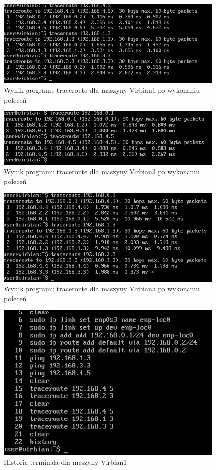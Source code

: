 \documentclass[a4paper]{scrartcl}
\begin{document}
\begin{figure}
  \includegraphics[width=\linewidth]{trvib1.png}
  \caption{Wynik programu traceroute dla maszyny Virbian1 po wykonaniu poleceń}
\end{figure}
\begin{figure}
  \includegraphics[width=\linewidth]{trvib3.png}
  \caption{Wynik programu traceroute dla maszyny Virbian3 po wykonaniu poleceń}
\end{figure}
\begin{figure}
  \includegraphics[width=\linewidth]{trvib5.png}
  \caption{Wynik programu traceroute dla maszyny Virbian5 po wykonaniu poleceń}
\end{figure}
\begin{figure}
  \includegraphics[width=\linewidth]{hvib1.png}
  \caption{Historia terminala dla maszyny Virbian1}
\end{figure}
\end{document}
